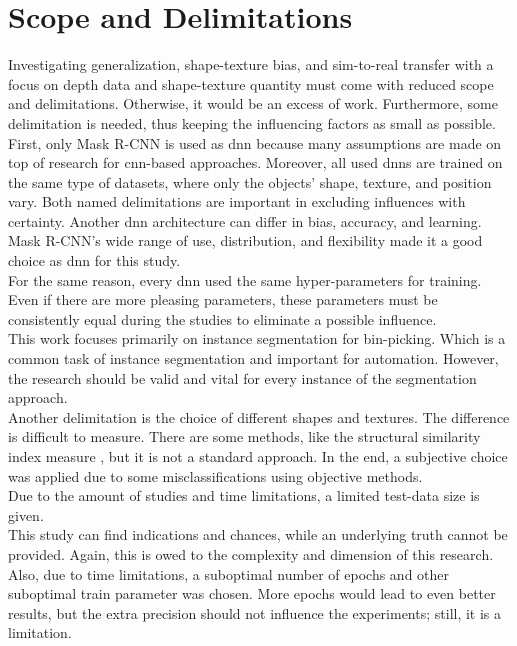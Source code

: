 	
	
	\section{Scope and Delimitations}
	\label{sec:scope-and-delimitations}
		Investigating generalization, shape-texture bias, and sim-to-real transfer with a focus on depth data and shape-texture quantity must come with reduced scope and delimitations. Otherwise, it would be an excess of work. Furthermore, some delimitation is needed, thus keeping the influencing factors as small as possible.\\
		First, only Mask R-CNN \cite{Kaiming2017} is used as \ac{dnn} because many assumptions are made on top of research for \ac{cnn}-based approaches.
		Moreover, all used \ac{dnn}s are trained on the same type of datasets, where only the objects' shape, texture, and position vary.
		Both named delimitations are important in excluding influences with certainty. Another \ac{dnn} architecture can differ in bias, accuracy, and learning. Mask R-CNN's wide range of use, distribution, and flexibility made it a good choice as \ac{dnn} for this study.\\
		For the same reason, every \ac{dnn} used the same hyper-parameters for training. Even if there are more pleasing parameters, these parameters must be consistently equal during the studies to eliminate a possible influence.\\
		This work focuses primarily on instance segmentation for bin-picking. Which is a common task of instance segmentation and important for automation\cite{Raj2023}\cite{Danielczuk2019}\cite{Xie2021}. However, the research should be valid and vital for every instance of the segmentation approach.\\
		Another delimitation is the choice of different shapes and textures. The difference is difficult to measure. There are some methods, like the structural similarity index measure \cite{Wang2004}, but it is not a standard approach. In the end, a subjective choice was applied due to some misclassifications using objective methods.
		\\
		Due to the amount of studies and time limitations, a limited test-data size is given.\\
		This study can find indications and chances, while an underlying truth cannot be provided. Again, this is owed to the complexity and dimension of this research.\\
		Also, due to time limitations, a suboptimal number of epochs and other suboptimal train parameter was chosen. More epochs would lead to even better results, but the extra precision should not influence the experiments; still, it is a limitation.
